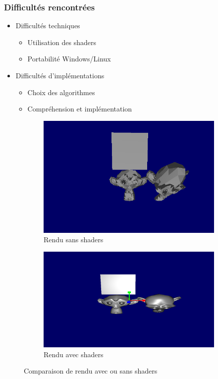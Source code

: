 \documentclass{beamer}
\begin{document}

\begin{frame}
\frametitle{Difficultés rencontrées}
\begin{itemize}[label=$\bullet$]
\item Difficultés techniques
\begin{itemize}[label=$\circ$]
\item Utilisation des shaders
\item Portabilité Windows/Linux
\end{itemize}
\item Difficultés d'implémentations
\begin{itemize}[label=$\circ$]
\item Choix des algorithmes
\item Compréhension et implémentation
\end{itemize}
\end{itemize}

\begin{figure}
\centering
\begin{subfigure}{.4\textwidth}
  \centering
  \includegraphics[width=1\linewidth]{rendu_sans_shader.png}
  \caption{Rendu sans shaders}
\end{subfigure}
\begin{subfigure}{.4\textwidth}
  \centering
  \includegraphics[width=1\linewidth]{singe_shaders.png}
  \caption{Rendu avec shaders}
\end{subfigure}
\caption{Comparaison de rendu avec ou sans shaders}
\end{figure}


\end{frame}
\end{document}
